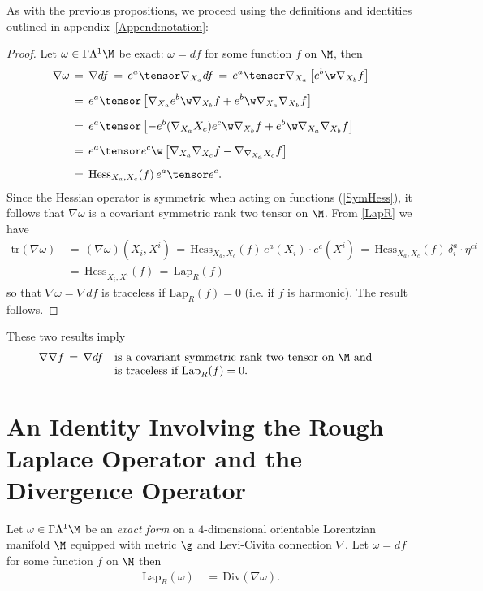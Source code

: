 \documentclass[sections]{tjwNOTES}
\newcommand{\LapR}{\text{Lap}_{R}}
\newcommand{\Div}{\text{Div}}
\newcommand{\Hess}{\text{Hess}}
\begin{document}
As with the previous propositions, we proceed using the definitions and identities outlined in appendix~\ref{Append:notation}:\\[0.2cm]

\begin{proof}
	Let $\omega\in\Gamma\Lambda^{1}\M$ be exact: $\omega=df$ for some function $f$ on $\M$, then
	\begin{align*}
		\nabla\omega &\,=\, \nabla df \,=\, e^{a}\tensor \nabla_{X_{a}}df \,=\, e^{a}\tensor \nabla_{X_{a}}\left[ e^{b} \w \nabla_{X_{b}}f\right] \\[0.2cm]
		&\,=\, e^{a} \tensor \left[ \nabla_{X_{a}}e^{b} \w \nabla_{X_{b}}f + e^{b} \w \nabla_{X_{a}}\nabla_{X_{b}}f\right]  \\[0.2cm]
		&\,=\, e^{a} \tensor \left[ -e^{b}(\nabla_{X_{a}}X_{c})e^{c} \w \nabla_{X_{b}}f + e^{b} \w \nabla_{X_{a}}\nabla_{X_{b}}f\right] \\[0.2cm]
		&\,=\, e^{a} \tensor e^{c} \w \left[ \nabla_{X_{a}}\nabla_{X_{c}}f - \nabla_{\nabla_{X_{a}}X_{c}}f \right] \\[0.2cm]
		&\,=\, \Hess_{X_{a},X_{c}}(f)\,e^{a} \tensor e^{c}.
	\end{align*}
	Since the Hessian operator is symmetric when acting on functions (\ref{SymHess}), it follows that $\nabla\omega$ is a covariant symmetric rank two tensor on $\M$. From \ref{LapR} we have
	\begin{align*}
		\text{tr}(\nabla\omega) &\,=\, (\nabla\omega)(X_{i},X^{i}) \,=\, \Hess_{X_{a},X_{c}}(f)\,e^{a}(X_{i})\cdot e^{c}(X^{i}) \,=\, \Hess_{X_{a},X_{c}}(f)\,\delta^{a}_{i}\cdot \eta^{ci} \\[0.2cm]
		&\,=\, \Hess_{X_{i},X^{i}}(f) \,=\, \LapR(f)
	\end{align*}
	so that $\nabla\omega=\nabla df$ is traceless if $\LapR(f)=0$ (i.e. if $f$ is harmonic). The result follows. 
\end{proof}

These two results imply
\begin{align}\label{nabdfSYM}
	\nabla\nabla f &\,=\, \nabla df \quad \parbox[t]{8cm}{is a covariant symmetric rank two tensor on $\M$ and is traceless if $\LapR(f)=0$.}
\end{align}


\section{An Identity Involving the Rough Laplace Operator and the Divergence Operator}
\begin{prop*}{}
	Let $\omega \in \Gamma\Lambda^{1}\M$ be an {\it exact form} on a $4$-dimensional orientable Lorentzian manifold $\M$ equipped with metric $\g$ and Levi-Civita connection $\nabla$. Let $\omega=df$ for some function $f$ on $\M$ then
	\begin{align}\label{LapRDivIDENT}
		\LapR(\omega) &\,=\, \Div(\nabla\omega).
	\end{align}
\end{prop*}
\end{document}
